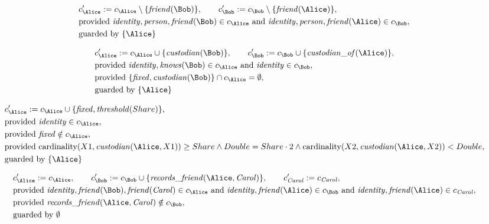 \begin{align*}
&
c'_
{
\Alice
}
 := 
c_
{
\Alice
}
 \setminus 
\{
\mathit{\detokenize{
friend
}}
(
\Bob
)
\}
, \qquad 
c'_
{
\Bob
}
 := 
c_
{
\Bob
}
 \setminus 
\{
\mathit{\detokenize{
friend
}}
(
\Alice
)
\}
,\\
&
\text{provided } 
\mathit{\detokenize{
identity
}}
,
\mathit{\detokenize{
person
}}
,
\mathit{\detokenize{
friend
}}
(
\Bob
)
 \in c_
{
\Alice
}
 \text{ and } 
\mathit{\detokenize{
identity
}}
,
\mathit{\detokenize{
person
}}
,
\mathit{\detokenize{
friend
}}
(
\Alice
)
 \in c_
{
\Bob
}
,\\
&
\text{guarded by } \{
\Alice
\}
\end{align*}

\begin{align*}
&
c'_
{
\Alice
}
 := 
c_
{
\Alice
}
 \cup 
\{
\mathit{\detokenize{
custodian
}}
(
\Bob
)
\}
, \qquad 
c'_
{
\Bob
}
 := 
c_
{
\Bob
}
 \cup 
\{
\mathit{\detokenize{
custodian_of
}}
(
\Alice
)
\}
,\\
&
\text{provided } 
\mathit{\detokenize{
identity
}}
,
\mathit{\detokenize{
knows
}}
(
\Bob
)
 \in c_
{
\Alice
}
 \text{ and } 
\mathit{\detokenize{
identity
}}
 \in c_
{
\Bob
}
,\\
&
\text{provided } 
\{
\mathit{\detokenize{
fixed
}}
,
\mathit{\detokenize{
custodian
}}
(
\Bob
)
\}
 \cap c_
{
\Alice
}
 = \emptyset
,\\
&
\text{guarded by } \{
\Alice
\}
\end{align*}

\begin{align*}
&
c'_
{
\Alice
}
 := 
c_
{
\Alice
}
 \cup 
\{
\mathit{\detokenize{
fixed
}}
,
\mathit{\detokenize{
threshold
}}
(
Share
)
\}
,\\
&
\text{provided } 
\mathit{\detokenize{
identity
}}
 \in c_
{
\Alice
}
,\\
&
\text{provided } 
\mathit{\detokenize{
fixed
}}
 \notin c_
{
\Alice
}
,\\
&
\text{provided } 
\mathrm{cardinality}(
X1
,
\mathit{\detokenize{
custodian
}}
(
\Alice
,
X1
)
)
\ge
Share
\land
Double
=
Share
\cdot
2
\land
\mathrm{cardinality}(
X2
,
\mathit{\detokenize{
custodian
}}
(
\Alice
,
X2
)
)
<
Double
,\\
&
\text{guarded by } \{
\Alice
\}
\end{align*}

\begin{align*}
&
c'_
{
\Alice
}
 := 
c_
{
\Alice
}
, \qquad 
c'_
{
\Bob
}
 := 
c_
{
\Bob
}
 \cup 
\{
\mathit{\detokenize{
records_friend
}}
(
\Alice
,
\mathit{Carol}
)
\}
, \qquad 
c'_
{
\mathit{Carol}
}
 := 
c_
{
\mathit{Carol}
}
,\\
&
\text{provided } 
\mathit{\detokenize{
identity
}}
,
\mathit{\detokenize{
friend
}}
(
\Bob
)
,
\mathit{\detokenize{
friend
}}
(
\mathit{Carol}
)
 \in c_
{
\Alice
}
 \text{ and } 
\mathit{\detokenize{
identity
}}
,
\mathit{\detokenize{
friend
}}
(
\Alice
)
 \in c_
{
\Bob
}
 \text{ and } 
\mathit{\detokenize{
identity
}}
,
\mathit{\detokenize{
friend
}}
(
\Alice
)
 \in c_
{
\mathit{Carol}
}
,\\
&
\text{provided } 
\mathit{\detokenize{
records_friend
}}
(
\Alice
,
\mathit{Carol}
)
 \notin c_
{
\Bob
}
,\\
&
\text{guarded by } \emptyset
\end{align*}
